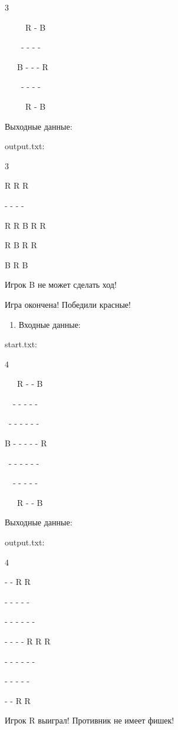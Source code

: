 \documentclass[a4paper]{article}
\begin{document}
\foreignlanguage{english}{3}

\foreignlanguage{english}{\ \ \ \ \ R - B }

\foreignlanguage{english}{\ \ \ \ {}- - - - \ \ \ \ }

\foreignlanguage{english}{\ \ \ B - - - R }

\foreignlanguage{english}{\ \ \ \ {}- - - - }

\foreignlanguage{english}{\ \ \ \ \ R - B}

Выходные данные:

output.txt:

3

R R R 

{}- - - - 

R R B R R 

R B R R 

B R B

Игрок B не может сделать ход!

Игра окончена! Победили красные!

\begin{enumerate}[resume*=listWWNumv]
\item Входные данные:
\end{enumerate}
\foreignlanguage{english}{start.txt:}

\foreignlanguage{english}{4}

\foreignlanguage{english}{\ \ \ R - - B}

\foreignlanguage{english}{\ \ {}- - - - -}

\foreignlanguage{english}{\ {}- - - - - -}

\foreignlanguage{english}{B - - - - - R}

\foreignlanguage{english}{\ {}- - - - - -}

\foreignlanguage{english}{\ \ {}- - - - -}

\foreignlanguage{english}{\ \ \ R - - B}

Выходные данные:

output.txt:

4

{}- - R R 

{}- - - - - 

{}- - - - - - 

{}- - - - R R R 

{}- - - - - - 

{}- - - - - 

{}- - R R 

Игрок R выиграл! Противник не имеет фишек!
\end{document}
